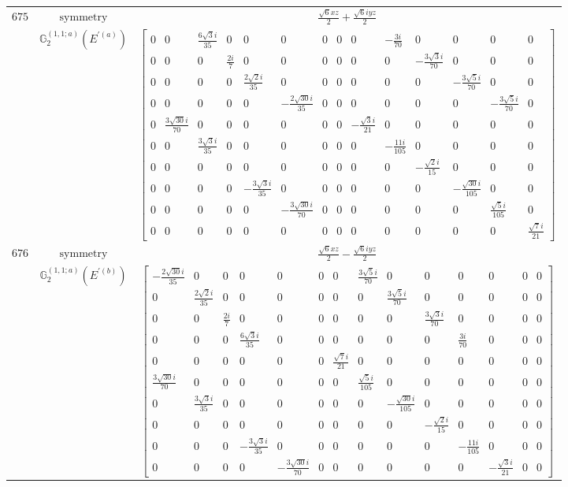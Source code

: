 \documentclass[fleqn,8pt,landscape]{jsarticle}
\begin{document}
\begin{longtable}{ccc}
$ 675 $ & $ \text{symmetry} $ & $ \frac{\sqrt{6} x z}{2} + \frac{\sqrt{6} i y z}{2} $ \\
$  $ & $ \mathbb{G}_{2}^{(1,1;a)}(E^{\prime(a)}) $ & $ \begin{bmatrix} 0 & 0 & \frac{6 \sqrt{3} i}{35} & 0 & 0 & 0 & 0 & 0 & 0 & - \frac{3 i}{70} & 0 & 0 & 0 & 0 \\ 0 & 0 & 0 & \frac{2 i}{7} & 0 & 0 & 0 & 0 & 0 & 0 & - \frac{3 \sqrt{3} i}{70} & 0 & 0 & 0 \\ 0 & 0 & 0 & 0 & \frac{2 \sqrt{2} i}{35} & 0 & 0 & 0 & 0 & 0 & 0 & - \frac{3 \sqrt{5} i}{70} & 0 & 0 \\ 0 & 0 & 0 & 0 & 0 & - \frac{2 \sqrt{30} i}{35} & 0 & 0 & 0 & 0 & 0 & 0 & - \frac{3 \sqrt{5} i}{70} & 0 \\ 0 & \frac{3 \sqrt{30} i}{70} & 0 & 0 & 0 & 0 & 0 & 0 & - \frac{\sqrt{3} i}{21} & 0 & 0 & 0 & 0 & 0 \\ 0 & 0 & \frac{3 \sqrt{3} i}{35} & 0 & 0 & 0 & 0 & 0 & 0 & - \frac{11 i}{105} & 0 & 0 & 0 & 0 \\ 0 & 0 & 0 & 0 & 0 & 0 & 0 & 0 & 0 & 0 & - \frac{\sqrt{2} i}{15} & 0 & 0 & 0 \\ 0 & 0 & 0 & 0 & - \frac{3 \sqrt{3} i}{35} & 0 & 0 & 0 & 0 & 0 & 0 & - \frac{\sqrt{30} i}{105} & 0 & 0 \\ 0 & 0 & 0 & 0 & 0 & - \frac{3 \sqrt{30} i}{70} & 0 & 0 & 0 & 0 & 0 & 0 & \frac{\sqrt{5} i}{105} & 0 \\ 0 & 0 & 0 & 0 & 0 & 0 & 0 & 0 & 0 & 0 & 0 & 0 & 0 & \frac{\sqrt{7} i}{21} \end{bmatrix} $ \\ \hline
$ 676 $ & $ \text{symmetry} $ & $ \frac{\sqrt{6} x z}{2} - \frac{\sqrt{6} i y z}{2} $ \\
$  $ & $ \mathbb{G}_{2}^{(1,1;a)}(E^{\prime(b)}) $ & $ \begin{bmatrix} - \frac{2 \sqrt{30} i}{35} & 0 & 0 & 0 & 0 & 0 & 0 & \frac{3 \sqrt{5} i}{70} & 0 & 0 & 0 & 0 & 0 & 0 \\ 0 & \frac{2 \sqrt{2} i}{35} & 0 & 0 & 0 & 0 & 0 & 0 & \frac{3 \sqrt{5} i}{70} & 0 & 0 & 0 & 0 & 0 \\ 0 & 0 & \frac{2 i}{7} & 0 & 0 & 0 & 0 & 0 & 0 & \frac{3 \sqrt{3} i}{70} & 0 & 0 & 0 & 0 \\ 0 & 0 & 0 & \frac{6 \sqrt{3} i}{35} & 0 & 0 & 0 & 0 & 0 & 0 & \frac{3 i}{70} & 0 & 0 & 0 \\ 0 & 0 & 0 & 0 & 0 & 0 & \frac{\sqrt{7} i}{21} & 0 & 0 & 0 & 0 & 0 & 0 & 0 \\ \frac{3 \sqrt{30} i}{70} & 0 & 0 & 0 & 0 & 0 & 0 & \frac{\sqrt{5} i}{105} & 0 & 0 & 0 & 0 & 0 & 0 \\ 0 & \frac{3 \sqrt{3} i}{35} & 0 & 0 & 0 & 0 & 0 & 0 & - \frac{\sqrt{30} i}{105} & 0 & 0 & 0 & 0 & 0 \\ 0 & 0 & 0 & 0 & 0 & 0 & 0 & 0 & 0 & - \frac{\sqrt{2} i}{15} & 0 & 0 & 0 & 0 \\ 0 & 0 & 0 & - \frac{3 \sqrt{3} i}{35} & 0 & 0 & 0 & 0 & 0 & 0 & - \frac{11 i}{105} & 0 & 0 & 0 \\ 0 & 0 & 0 & 0 & - \frac{3 \sqrt{30} i}{70} & 0 & 0 & 0 & 0 & 0 & 0 & - \frac{\sqrt{3} i}{21} & 0 & 0 \end{bmatrix} $ \\ \hline

\end{longtable}
\end{document}
